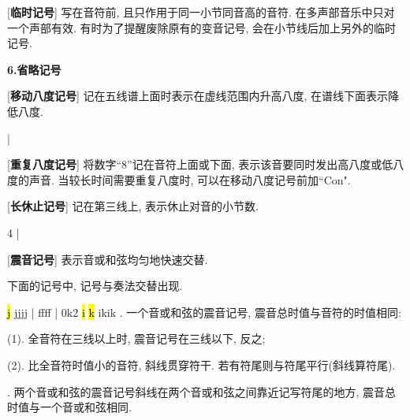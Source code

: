 \clearpage

[\textbf{临时记号}] 写在音符前, 且只作用于同一小节同音高的音符. 在多声部音乐中只对一个声部有效. 有时为了提醒废除原有的变音记号, 会在小节线后加上另外的临时记号.\par

\begin{center}
 \textbf{6.省略记号}\\
\end{center}

[\textbf{移动八度记号}] 记在五线谱上面时表示在虚线范围内升高八度, 在谱线下面表示降低八度.\par
\startextract 
\Notes {}  \en\bar
\Notes {}  \en
\zendextract 

[\textbf{重复八度记号}] 将数字``8''记在音符上面或下面, 表示该音要同时发出高八度或低八度的声音. 当较长时间需要重复八度时, 可以在移动八度记号前加``Con".\par

[\textbf{长休止记号}] 记在第三线上, 表示休止对音的小节数.\par
\startextract 
\Notes {} 4 \en
\Notes \en\bar
\zendextract 

[\textbf{震音记号}] 表示音或和弦均匀地快速交替.\par
\qquad 下面的记号中, 记号与奏法交替出现.\par
\startextract 
\Notes {}\hl{j} \Qqbl jjjj  \en\bar
\Notes {} \Qqbbu ffff \en\bar
\Notes \ibbl0k2 \hl{i}  \hl{k} \Qqbbl ikik\en
\zendextract 
{}. 一个音或和弦的震音记号, 震音总时值与音符的时值相同:\par
\qquad \qquad (1). 全音符在三线以上时, 震音记号在三线以下, 反之;\par
\qquad \qquad (2). 比全音符时值小的音符, 斜线贯穿符干. 若有符尾则与符尾平行(斜线算符尾).\par
{}. 两个音或和弦的震音记号斜线在两个音或和弦之间靠近记写符尾的地方, 震音总时值与一个音或和弦相同.\par

